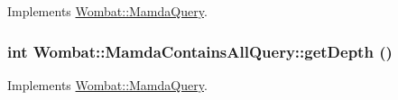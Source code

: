 Implements \hyperlink{classWombat_1_1MamdaQuery_d5a4bbc29d9a752db0d07fa1e3aa2f25}{Wombat::Mamda\-Query}.\hypertarget{classWombat_1_1MamdaContainsAllQuery_619fd4e1d11603e4e29926c0f2abf1cd}{
\subsubsection[getDepth]{\setlength{\rightskip}{0pt plus 5cm}int Wombat::Mamda\-Contains\-All\-Query::get\-Depth ()}}
\label{classWombat_1_1MamdaContainsAllQuery_619fd4e1d11603e4e29926c0f2abf1cd}




Implements \hyperlink{classWombat_1_1MamdaQuery_1658aee7db0fd2fce15c63293c428597}{Wombat::Mamda\-Query}.